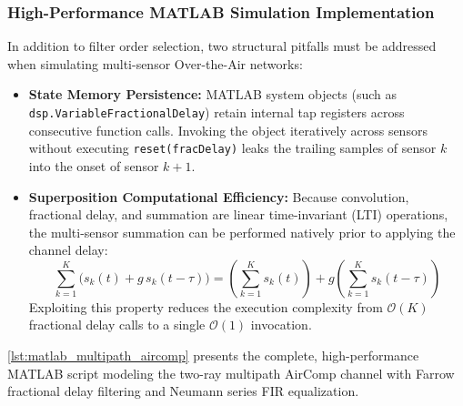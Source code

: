 \documentclass[Markos_Delaportas_1316.tex]{subfiles}
\begin{document}
\subsubsection{High-Performance MATLAB Simulation Implementation}
\label{subsubsec:matlab_code_implementation}
In addition to filter order selection, two structural pitfalls must
be addressed when simulating multi-sensor Over-the-Air networks:
\begin{itemize}[leftmargin=*]
    \item \textbf{State Memory Persistence:} MATLAB system objects
        (such as \texttt{dsp.VariableFractionalDelay}) retain internal
        tap registers across consecutive function calls. Invoking the
        object iteratively across sensors without executing
        \texttt{reset(fracDelay)} leaks the trailing samples of
        sensor $k$ into the onset of sensor $k+1$.
    \item \textbf{Superposition Computational Efficiency:} Because
        convolution, fractional delay, and summation are linear
        time-invariant (LTI) operations, the multi-sensor summation
        can be performed natively prior to applying the channel delay:
        \begin{equation}
            \sum_{k=1}^K \big( s_k(t) + g \, s_k(t - \tau) \big) =
            \left( \sum_{k=1}^K s_k(t) \right) + g \left(
            \sum_{k=1}^K s_k(t - \tau) \right)
            \label{eq:lti_superposition_property}
        \end{equation}
        Exploiting this property reduces the execution complexity
        from $\mathcal{O}(K)$ fractional delay calls to a single
        $\mathcal{O}(1)$ invocation.
\end{itemize}

\cref{lst:matlab_multipath_aircomp} presents the complete,
high-performance MATLAB script modeling the two-ray multipath AirComp channel
with Farrow fractional delay filtering and Neumann series FIR equalization.
\end{document}

